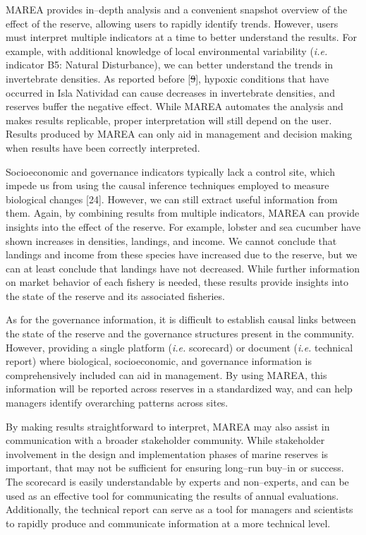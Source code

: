 \documentclass[12pt,]{article}
\providecommand{\DIFaddtex}[1]{{\protect\color{blue}\uwave{#1}}} %
\providecommand{\DIFdeltex}[1]{{\protect\color{red}\sout{#1}}}                      %
\providecommand{\DIFaddbegin}{} %
\providecommand{\DIFaddend}{} %
\providecommand{\DIFdelbegin}{} %
\providecommand{\DIFdelend}{} %
\providecommand{\DIFadd}[1]{\texorpdfstring{\DIFaddtex{#1}}{#1}} %
\providecommand{\DIFdel}[1]{\texorpdfstring{\DIFdeltex{#1}}{}} %
\newcommand{\DIFscaledelfig}{0.5}
\newlength{\DIFdelgraphicswidth} %
\newlength{\DIFdelgraphicsheight} %
\newcommand{\DIFaddincludegraphics}[2][]{{\color{blue}\fbox{\DIFOincludegraphics[#1]{#2}}}} %
\newcommand{\DIFdelincludegraphics}[2][]{%
\sbox{\DIFdelgraphicsbox}{\DIFOincludegraphics[#1]{#2}}%
\settoboxwidth{\DIFdelgraphicswidth}{\DIFdelgraphicsbox} %
\settoboxtotalheight{\DIFdelgraphicsheight}{\DIFdelgraphicsbox} %
\scalebox{\DIFscaledelfig}{%
\parbox[b]{\DIFdelgraphicswidth}{\usebox{\DIFdelgraphicsbox}\\[-\baselineskip] \rule{\DIFdelgraphicswidth}{0em}}\llap{\resizebox{\DIFdelgraphicswidth}{\DIFdelgraphicsheight}{%
\setlength{\unitlength}{\DIFdelgraphicswidth}%
\begin{picture}(1,1)%
\thicklines\linethickness{2pt} %
{\color[rgb]{1,0,0}\put(0,0){\framebox(1,1){}}}%
{\color[rgb]{1,0,0}\put(0,0){\line( 1,1){1}}}%
{\color[rgb]{1,0,0}\put(0,1){\line(1,-1){1}}}%
\end{picture}%
}\hspace*{3pt}}} %
} %
\DeclareRobustCommand{\DIFaddbegin}{\DIFOaddbegin \let\includegraphics\DIFaddincludegraphics} %
\DeclareRobustCommand{\DIFaddend}{\DIFOaddend \let\includegraphics\DIFOincludegraphics} %
\DeclareRobustCommand{\DIFdelbegin}{\DIFOdelbegin \let\includegraphics\DIFdelincludegraphics} %
\DeclareRobustCommand{\DIFdelend}{\DIFOaddend \let\includegraphics\DIFOincludegraphics} %
\begin{document}
MAREA provides in--depth analysis and a convenient snapshot overview of
the effect of the reserve, allowing users to rapidly identify trends.
However, users must interpret multiple indicators at a time to better
understand the results. For example, with additional knowledge of local
environmental variability (\emph{i.e.} indicator B5: Natural
Disturbance), we can better understand the trends in invertebrate
densities. As reported before {[}\DIFdelbegin \DIFdel{9}\DIFdelend \DIFaddbegin \DIFadd{8}\DIFaddend {]}, hypoxic conditions that have
occurred in Isla Natividad can cause decreases in invertebrate
densities, and reserves buffer the negative effect. While MAREA
automates the analysis and makes results replicable, proper
interpretation will still depend on the user. Results produced by MAREA
can only aid in management and decision making when results have been
correctly interpreted.

Socioeconomic and governance indicators typically lack a control site,
which impede us from using the causal inference techniques employed to
measure biological changes {[}24{]}. However, we can still extract
useful information from them. Again, by combining results from multiple
indicators, MAREA can provide insights into the effect of the reserve.
For example, lobster and sea cucumber have shown increases in densities,
landings, and income. We cannot conclude that landings and income from
these species have increased due to the reserve, but we can at least
conclude that landings have not decreased. While further information on
market behavior of each fishery is needed, these results provide
insights into the state of the reserve and its associated fisheries.

As for the governance information, it is difficult to establish causal
links between the state of the reserve and the governance structures
present in the community. However, providing a single platform
(\emph{i.e.} scorecard) or document (\emph{i.e.} technical report) where
biological, socioeconomic, and governance information is comprehensively
included can aid in management. By using MAREA, this information will be
reported across reserves in a standardized way, and can help managers
identify overarching patterns across sites.

By making results straightforward to interpret, MAREA may also assist in
communication with a broader stakeholder community. While stakeholder
involvement in the design and implementation phases of marine reserves
is important, that may not be sufficient for ensuring long--run buy--in
or success. The scorecard is easily understandable by experts and
non--experts, and can be used as an effective tool for communicating the
results of annual evaluations. Additionally, the technical report can
serve as a tool for managers and scientists to rapidly produce and
communicate information at a more technical level.
\end{document}

